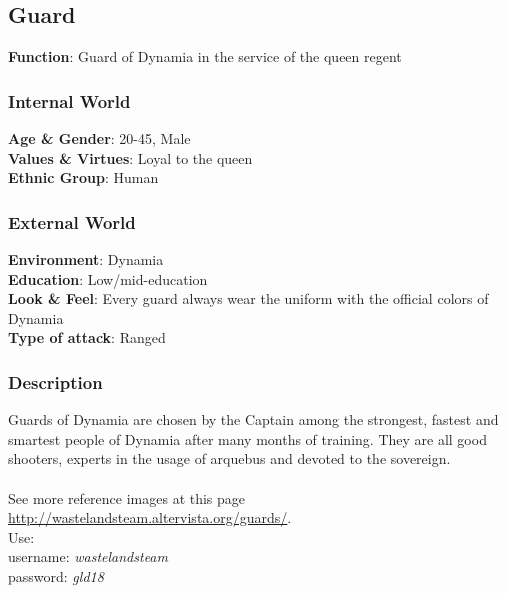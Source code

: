 \subsection{Guard}

\begin{minipage}{0.5\textwidth}
\textbf{Function}: Guard of Dynamia in the service of the queen regent

\subsubsection{Internal World}

\textbf{Age \& Gender}: 20-45, Male \\
\textbf{Values \& Virtues}: Loyal to the queen\\
\textbf{Ethnic Group}: Human

\subsubsection{External World}
\textbf{Environment}: Dynamia \\
\textbf{Education}: Low/mid-education \\
\textbf{Look \& Feel}: Every guard always wear the uniform with the official colors of Dynamia \\
\textbf{Type of attack}: Ranged \\
\end{minipage}%
%
\hfill\begin{minipage}{0.4\textwidth}
\end{minipage}


\subsubsection{Description}
Guards of Dynamia are chosen by the Captain among the strongest, fastest and smartest people of Dynamia after many months of training. They are all good shooters, experts in the usage of arquebus and devoted to the sovereign.\\\\
See more reference images at this page \href{http://wastelandsteam.altervista.org/guards/}{http://wastelandsteam.altervista.org/guards/}.\\
Use:\\
username: \textit{wastelandsteam}\\
password: \textit{gld18}



